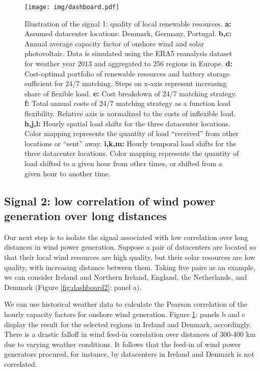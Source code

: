\begin{figure}
    \centering
    \texttt{[image: img/dashboard.pdf]}
    \caption{Illustration of the signal 1: quality of local renewable resources.
        \textbf{a:} Assumed datacenter locations: Denmark, Germany, Portugal.
        \textbf{b,c:} Annual average capacity factor of onshore wind and solar photovoltaic. Data is simulated using the ERA5 reanalysis dataset for weather year 2013 and aggregated to 256 regions in Europe.
        \textbf{d:} Cost-optimal portfolio of renewable resources and battery storage sufficient for 24/7 matching. Steps on x-axis represent increasing share of flexible load.
        \textbf{e:} Cost breakdown of 24/7 matching strategy.
        \textbf{f:} Total annual costs of 24/7 matching strategy as a function load flexibility. Relative axis is normalized to the costs of inflexible load.
        \textbf{h,j,l:} Hourly spatial load shifts for the three datacenter locations. Color mapping represents the quantity of load \enquote{received} from other locations or \enquote{sent} away.
        \textbf{i,k,m:} Hourly temporal load shifts for the three datacenter locations. Color mapping represents the quantity of load shifted to a given hour from other times, or shifted from a given hour to another time.}
    \label{fig:dashboard1}
\end{figure}


\subsection{Signal 2: low correlation of wind power generation over long distances}

Our next step is to isolate the signal associated with low correlation over long distances in wind power generation. Suppose a pair of datacenters are located so that their local wind resources are high quality, but their solar resources are low quality, with increasing distance between them. Taking five pairs as an example, we can consider Ireland and Northern Ireland, England, the Netherlands, and Denmark (Figure \ref{fig:dashboard2}: panel a). 

We can use historical weather data to calculate the Pearson correlation of the  hourly capacity factors for onshore wind generation. Figure \ref{fig:dashboard1}: panels b and c display the result for the selected regions in Ireland and Denmark, accordingly. There is a drastic falloff in wind feed-in correlation over distances of 300-400 km due to varying weather conditions. It follows that the feed-in of wind power generators procured, for instance, by datacenters in Ireland and Denmark is not correlated.

